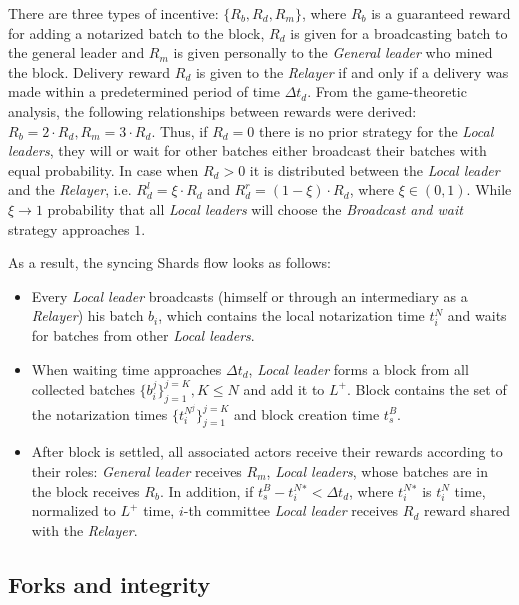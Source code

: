 There are three types of incentive: ${\{R_b, R_d, R_m\}}$, where $R_b$ is a guaranteed reward for adding a notarized batch to the block, $R_d$ is given for a broadcasting batch to the general leader and $R_m$ is given personally to the \emph{General leader} who mined the block.
Delivery reward $R_d$ is given to the \emph{Relayer} if and only if a delivery was made within a predetermined period of time $\Delta t_d$.
From the game-theoretic analysis, the following relationships between rewards were derived: ${R_b = 2 \cdot R_d, R_m = 3 \cdot R_d}$.
Thus, if ${R_d=0}$ there is no prior strategy for the \emph{Local leaders}, they will or wait for other batches either broadcast their batches with equal probability.
In case when ${R_d>0}$ it is distributed between the \emph{Local leader} and the \emph{Relayer}, i.e. ${R^l_d = \xi \cdot R_d}$ and  ${R^r_d = (1 - \xi) \cdot R_d}$, where ${\xi \in (0, 1)}$.
While ${\xi \rightarrow 1}$ probability that all \emph{Local leaders} will choose the \emph{Broadcast and wait} strategy approaches $1$.

As a result, the syncing Shards flow looks as follows:
\begin{itemize}
    \item Every \emph{Local leader} broadcasts (himself or through an intermediary as a \emph{Relayer}) his batch $b_i$, which contains the local notarization time $t^N_i$ and waits for batches from other \emph{Local leaders}.
    \item When waiting time approaches $\Delta t_d$, \emph{Local leader} forms a block from all collected batches ${\{b_i^j\}_{j=1}^{j=K}, K \le N}$ and add it to $L^+$.
    Block contains the set of the notarization times $\{t^{N^j}_i\}_{j=1}^{j=K}$ and block creation time $t^B_s$.
    \item After block is settled, all associated actors receive their rewards according to their roles: \emph{General leader} receives $R_m$, \emph{Local leaders}, whose batches are in the block receives $R_b$.
    In addition, if ${t^B_s - t^N_i^* < \Delta t_d}$, where $t^N_i^*$ is $t^N_i$ time, normalized to $L^+$ time, $i$-th committee \emph{Local leader} receives $R_d$ reward shared with the \emph{Relayer}.
\end{itemize}

\subsection{Forks and integrity}\label{subsec:resolving-forks}


